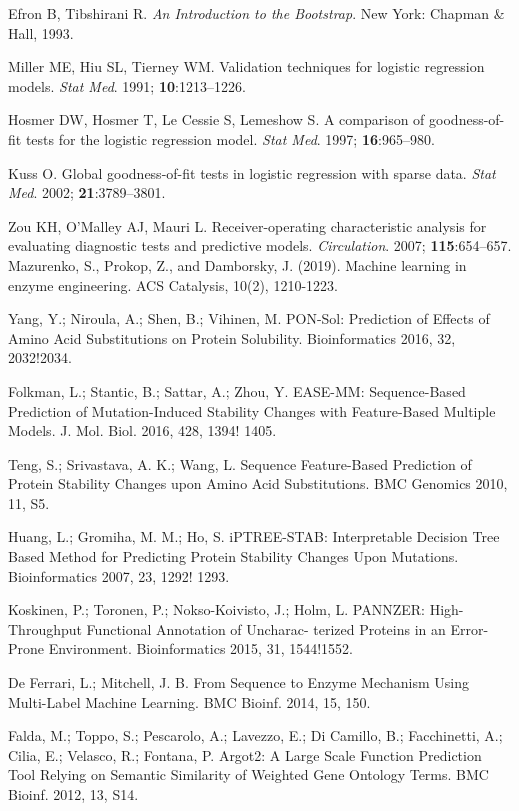 \documentclass[12pt]{article}
\begin{document}
\begin{thebibliography}{99}
Efron B, Tibshirani R. \textit{An Introduction to the Bootstrap}. New York: Chapman \& Hall, 1993.

Miller ME, Hiu SL, Tierney WM. Validation techniques for logistic regression models. \textit{Stat Med}. 1991; \textbf{10}:1213–1226.

Hosmer DW, Hosmer T, Le Cessie S, Lemeshow S. A comparison of goodness-of-fit tests for the logistic regression model. \textit{Stat Med}. 1997; \textbf{16}:965–980.

Kuss O. Global goodness-of-fit tests in logistic regression with sparse data. \textit{Stat Med}. 2002; \textbf{21}:3789–3801.

Zou KH, O'Malley AJ, Mauri L. Receiver-operating characteristic analysis for evaluating diagnostic tests and predictive models. \textit{Circulation}. 2007; \textbf{115}:654–657.
Mazurenko, S., Prokop, Z., and Damborsky, J. (2019). Machine learning in enzyme engineering. ACS Catalysis, 10(2), 1210-1223. 

 Yang, Y.; Niroula, A.; Shen, B.; Vihinen, M. PON-Sol: Prediction of Effects of Amino Acid Substitutions on Protein Solubility. Bioinformatics 2016, 32, 2032!2034.

 Folkman, L.; Stantic, B.; Sattar, A.; Zhou, Y. EASE-MM: Sequence-Based Prediction of Mutation-Induced Stability Changes with Feature-Based Multiple Models. J. Mol. Biol. 2016, 428, 1394! 1405.

 Teng, S.; Srivastava, A. K.; Wang, L. Sequence Feature-Based Prediction of Protein Stability Changes upon Amino Acid Substitutions. BMC Genomics 2010, 11, S5.

 Huang, L.; Gromiha, M. M.; Ho, S. iPTREE-STAB: Interpretable Decision Tree Based Method for Predicting Protein Stability Changes Upon Mutations. Bioinformatics 2007, 23, 1292! 1293.


 Koskinen, P.; Toronen, P.; Nokso-Koivisto, J.; Holm, L. PANNZER: High-Throughput Functional Annotation of Uncharac- terized Proteins in an Error-Prone Environment. Bioinformatics 2015, 31, 1544!1552.

 De Ferrari, L.; Mitchell, J. B. From Sequence to Enzyme Mechanism Using Multi-Label Machine Learning. BMC Bioinf. 2014, 15, 150.

 Falda, M.; Toppo, S.; Pescarolo, A.; Lavezzo, E.; Di Camillo, B.; Facchinetti, A.; Cilia, E.; Velasco, R.; Fontana, P. Argot2: A Large Scale Function Prediction Tool Relying on Semantic Similarity of Weighted Gene Ontology Terms. BMC Bioinf. 2012, 13, S14.


\end{thebibliography}
\end{document}
